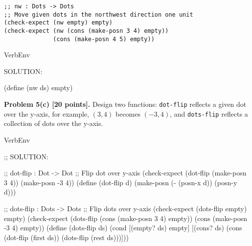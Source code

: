 \documentclass[12pt]{article}
\begin{document}
\begin{verbatim}
;; nw : Dots -> Dots
;; Move given dots in the northwest direction one unit
(check-expect (nw empty) empty)
(check-expect (nw (cons (make-posn 3 4) empty))
              (cons (make-posn 4 5) empty))
\end{verbatim}


\begin{SaveVerbatim}{VerbEnv}
  
SOLUTION:

(define (nw ds) empty)
        
\end{SaveVerbatim}


\newpage

\noindent
{\bf Problem 5(c) [20 points].}
%
Design two functions: {\tt dot-flip} reflects a given dot over the
y-axis, for example, $(3,4)$ becomes $(-3,4)$, and {\tt dots-flip}
reflects a collection of dots over the y-axis.
\begin{SaveVerbatim}{VerbEnv}

;; SOLUTION:
  
;; dot-flip : Dot -> Dot
;; Flip dot over y-axis
(check-expect (dot-flip (make-posn 3 4)) (make-posn -3 4))
(define (dot-flip d)
  (make-posn (- (posn-x d)) (posn-y d)))
  
;; dots-flip : Dots -> Dots
;; Flip dots over y-axis
(check-expect (dots-flip empty) empty)
(check-expect (dots-flip (cons (make-posn 3 4) empty))
              (cons (make-posn -3 4) empty))
(define (dots-flip ds)
  (cond [(empty? ds) empty]
        [(cons? ds) 
         (cons (dot-flip (first ds))
               (dots-flip (rest ds)))]))                   
\end{SaveVerbatim}

  
\newpage








\end{document}
